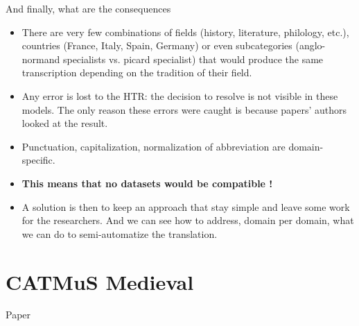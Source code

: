 \documentclass[aspectratio=169]{beamer}
\begin{document}
\begin{frame}{And finally, what are the consequences}
    \begin{itemize}
        \item There are very few combinations of fields (history, literature, philology, etc.), countries (France, Italy, Spain, Germany) or even subcategories (anglo-normand specialists vs. picard specialist) that would produce the same transcription depending on the tradition of their field.
        \item Any error is lost to the HTR: the decision to resolve is not visible in these models. The only reason these errors were caught is because papers' authors looked at the result.
        \item Punctuation, capitalization, normalization of abbreviation are domain-specific.
        \item<2> \textbf{This means that no datasets would be compatible !}
        \item<2> A solution is then to keep an approach that stay simple and leave some work for the researchers. And we can see how to address, domain per domain, what we can do to semi-automatize the translation.
    \end{itemize}
\end{frame}


\section{CATMuS Medieval}

\begin{frame}{Paper}
\end{frame}

\end{document}
